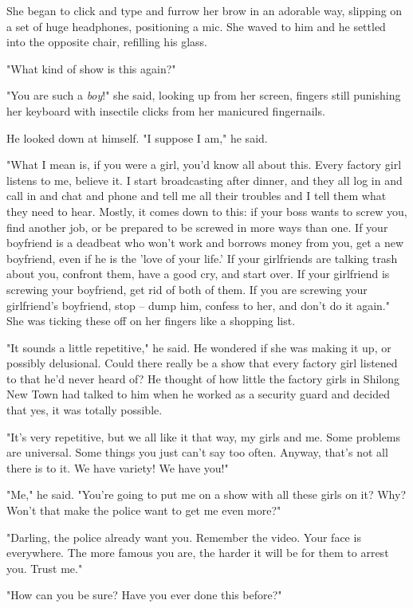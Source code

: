 She began to click and type and furrow her brow in an adorable way,
slipping on a set of huge headphones, positioning a mic. She waved
to him and he settled into the opposite chair, refilling his
glass.

"What kind of show is this again?"

"You are such a \emph{boy}!" she said, looking up from her screen,
fingers still punishing her keyboard with insectile clicks from her
manicured fingernails.

He looked down at himself. "I suppose I am," he said.

"What I mean is, if you were a girl, you'd know all about this.
Every factory girl listens to me, believe it. I start broadcasting
after dinner, and they all log in and call in and chat and phone
and tell me all their troubles and I tell them what they need to
hear. Mostly, it comes down to this: if your boss wants to screw
you, find another job, or be prepared to be screwed in more ways
than one. If your boyfriend is a deadbeat who won't work and
borrows money from you, get a new boyfriend, even if he is the
'love of your life.' If your girlfriends are talking trash about
you, confront them, have a good cry, and start over. If your
girlfriend is screwing your boyfriend, get rid of both of them. If
you are screwing your girlfriend's boyfriend, stop -- dump him,
confess to her, and don't do it again." She was ticking these off
on her fingers like a shopping list.

"It sounds a little repetitive," he said. He wondered if she was
making it up, or possibly delusional. Could there really be a show
that every factory girl listened to that he'd never heard of? He
thought of how little the factory girls in Shilong New Town had
talked to him when he worked as a security guard and decided that
yes, it was totally possible.

"It's very repetitive, but we all like it that way, my girls and
me. Some problems are universal. Some things you just can't say too
often. Anyway, that's not all there is to it. We have variety! We
have you!"

"Me," he said. "You're going to put me on a show with all these
girls on it? Why? Won't that make the police want to get me even
more?"

"Darling, the police already want you. Remember the video. Your
face is everywhere. The more famous you are, the harder it will be
for them to arrest you. Trust me."

"How can you be sure? Have you ever done this before?"

